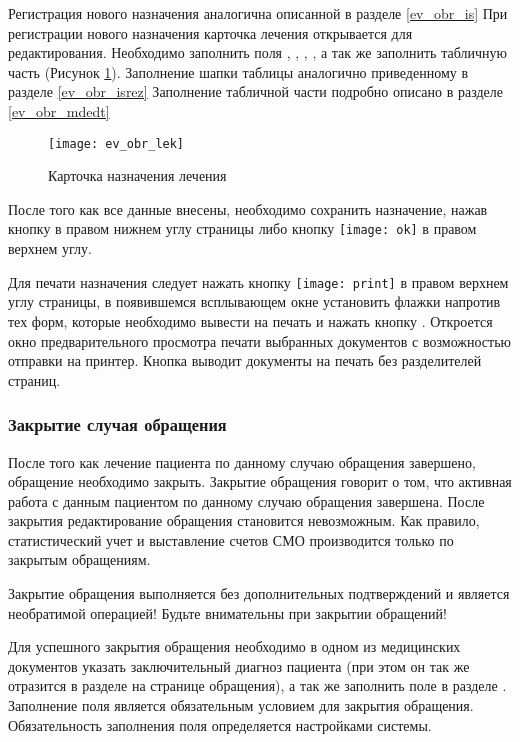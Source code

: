 Регистрация нового назначения аналогична описанной в разделе \ref{ev_obr_is} При регистрации нового назначения карточка лечения открывается для редактирования. Необходимо заполнить поля , , , , а так же заполнить табличную часть (Рисунок \ref{img_ev_obr_lek}). Заполнение шапки таблицы аналогично приведенному в разделе \ref{ev_obr_isrez} Заполнение табличной части подробно описано в разделе \ref{ev_obr_mdedt}

 \begin{figure}[ht]\centering
   \texttt{[image: ev\_obr\_lek]}
   \caption{Карточка назначения лечения}
   \label{img_ev_obr_lek}
 \end{figure}
 
После того как все данные внесены, необходимо сохранить назначение, нажав кнопку   в правом нижнем углу страницы либо кнопку \texttt{[image: ok]} в правом верхнем углу.    

Для печати назначения следует нажать кнопку \texttt{[image: print]} в правом верхнем углу страницы, в появившемся всплывающем окне установить флажки напротив тех форм, которые необходимо вывести на печать и нажать кнопку . Откроется окно предварительного просмотра печати выбранных документов с возможностью отправки на принтер. Кнопка  выводит документы на печать без разделителей страниц.


\subsubsection{Закрытие случая обращения}

После того как лечение пациента по данному случаю обращения завершено, обращение необходимо закрыть. Закрытие обращения говорит о том, что активная работа с данным пациентом по данному случаю обращения завершена. После закрытия редактирование обращения становится невозможным. Как правило, статистический учет и выставление счетов СМО производится только по закрытым обращениям.

\begin{vnim}
 Закрытие обращения выполняется без дополнительных подтверждений и является необратимой операцией! Будьте внимательны при закрытии обращений!
\end{vnim} 
 
Для успешного закрытия обращения необходимо в одном из медицинских документов указать заключительный диагноз пациента (при этом он так же отразится в разделе  на странице обращения), а так же заполнить поле  в разделе . Заполнение поля  является обязательным условием для закрытия обращения. Обязательность заполнения поля  определяется настройками системы.

